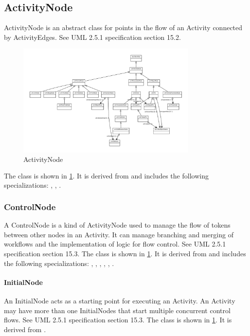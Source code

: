 \subsection{ActivityNode}%
\label{sec:uml:ActivityNode}%
ActivityNode is an abstract class for points in the flow of an Activity connected by ActivityEdges. See UML 2.5.1 specification section 15.2.%
\linebreak%
\linebreak%


\begin{figure}[h!]%
\centering%
\includegraphics[width=0.8\textwidth]{uml_classes/ActivityNode_abstraction_hierarchy.pdf}%
\caption{ActivityNode}%
\label{fig:ActivityNode}%
\end{figure}

%
The  class is shown in \ref{fig:ActivityNode}. It is derived from  and includes the following specializations: , , . %
%
\subsubsection{ControlNode}%
\label{sec:uml:ControlNode}%
A ControlNode is a kind of ActivityNode used to manage the flow of tokens between other nodes in an Activity. It can manage branching and merging of workflows and the implementation of logic for flow control. See UML 2.5.1 specification section 15.3.%
\linebreak%
\linebreak%
The  class is shown in \ref{fig:ActivityNode}. It is derived from  and includes the following specializations: , , , , , . %
%
\paragraph{InitialNode}%
\label{sec:uml:InitialNode}%
An InitialNode acts as a starting point for executing an Activity. An Activity may have more than one InitialNodes that start multiple concurrent control flows. See UML 2.5.1 specification section 15.3.%
\linebreak%
\linebreak%
The  class is shown in \ref{fig:ActivityNode}. It is derived from .%
%
